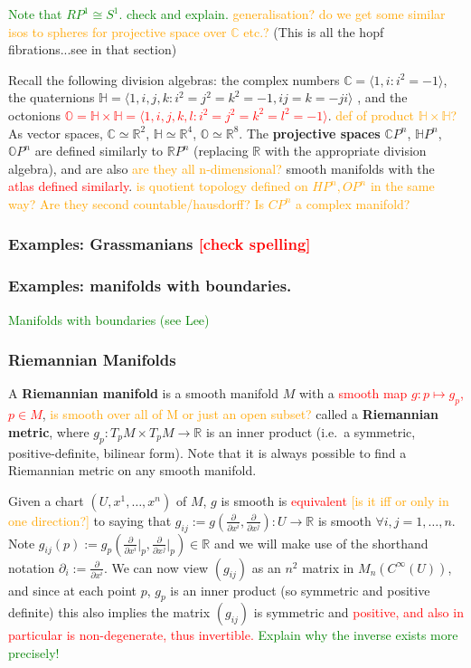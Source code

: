 \documentclass[a4paper]{article}
\theoremstyle{definition} \newtheorem*{definition}{Definition}
\theoremstyle{definition} \newtheorem*{definitions}{Definitions}
\theoremstyle{plain} \newtheorem{theorem}{Theorem}[section]
\theoremstyle{plain} \newtheorem{proposition}[theorem]{Proposition}
\theoremstyle{plain} \newtheorem{corollary}[theorem]{Corollary}
\theoremstyle{plain} \newtheorem{lemma}[theorem]{Lemma}
\theoremstyle{plain} \newtheorem{example}[theorem]{Example}
\newcommand{\checkCorrect}[1]{\textcolor{red}{#1}}
\newcommand{\question}[1]{\textcolor{orange}{#1}}
\newcommand{\finish}[1]{\textcolor{green}{#1}}
\newcommand{\defn}[1]{\textbf{#1}}
\newcommand{\realnos}{\mathbb{R}}
\newcommand{\complexnos}{\mathbb{C}}
\begin{document}
\finish{Note that $RP^1 \cong S^1$. check and explain.} \question{generalisation? do we get some similar isos to spheres for projective space over $\complexnos$ etc.?} (This is all the hopf fibrations...see in that section)

 Recall the following division algebras: the complex numbers $\complexnos = \langle 1, i: i^2=-1 \rangle$, the quaternions $\mathbb{H} = \langle 1, i, j, k: i^2=j^2=k^2=-1, ij=k=-ji \rangle$ , and the octonions \checkCorrect{$\mathbb{O} = \mathbb{H}\times \mathbb{H}=\langle 1, i, j, k, l: i^2=j^2=k^2=l^2=-1 \rangle$}. \question{def of product $\mathbb{H}\times \mathbb{H}$?} As vector spaces, $\complexnos \simeq \realnos^2$, $\mathbb{H} \simeq \realnos^4$, $\mathbb{O} \simeq \realnos^8$. The \defn{projective spaces} $\complexnos P^n$, $\mathbb{H} P^n$, $\mathbb{O} P^n$ are defined similarly to $\realnos P^n$ (replacing $\realnos$ with the appropriate division algebra), and are also \question{are they all n-dimensional?} smooth manifolds with the \checkCorrect{atlas defined similarly}.
\question{is quotient topology defined on $HP^n, OP^n$ in the same way? Are they second countable/hausdorff?}
\question{Is $CP^n$ a complex manifold?}

\subsubsection{Examples: Grassmanians \checkCorrect{[check spelling]}}


\subsubsection{Examples: manifolds with boundaries.}
\finish{Manifolds with boundaries (see Lee)}

\subsubsection{Riemannian Manifolds}
A \defn{Riemannian manifold} is a smooth manifold $M$ with a \checkCorrect{smooth map $g:p\mapsto g_p$, $p\in M$}, \question{is smooth over all of M or just an open subset?} called a \defn{Riemannian metric}, where $g_p:T_pM\times T_pM\to \realnos$ is an inner product (i.e.\ a symmetric, positive-definite, bilinear form).
Note that it is always possible to find a Riemannian metric on any smooth manifold.

Given a chart $(U, x^1, \ldots, x^n)$ of $M$, $g$ is smooth is \checkCorrect{equivalent} \question{[is it iff or only in one direction?]} to saying that $g_{ij}:=g(\frac{\partial}{\partial x^i}, \frac{\partial}{\partial x^j}):U\to \realnos$ is smooth $\forall i,j=1,\ldots, n$. Note $g_{ij}(p):=g_p(\frac{\partial}{\partial x^i}\vert_p, \frac{\partial}{\partial x^j}\vert_p) \in \realnos$ and we will make use of the shorthand notation $\partial_i:=\frac{\partial}{\partial x^i}$. We can now view $(g_{ij})$ as an $n^2$ matrix in $M_n(C^\infty (U))$, and since at each point $p$, $g_p$ is an inner product (so symmetric and positive definite) this also implies the matrix $(g_{ij})$ is symmetric and \checkCorrect{positive, and also in particular is non-degenerate, thus invertible.} \finish{Explain why the inverse exists more precisely!}
\end{document}
